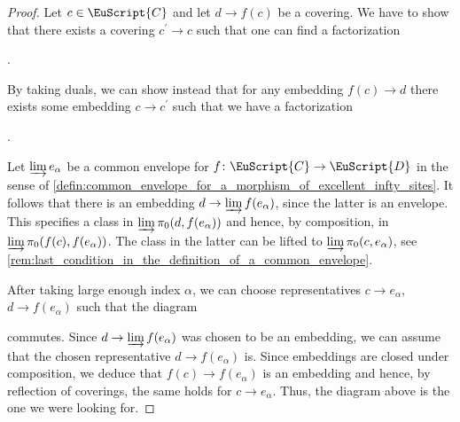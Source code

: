 \documentclass[oneside,a4paper]{amsart}
\newcommand{\euscr}[1]{\EuScript{#1}} %
\newcommand{\ccat}{\euscr{C}} %
\newcommand{\dcat}{\euscr{D}} %
\theoremstyle{plain}
\theoremstyle{definition}
\theoremstyle{remark}
\begin{document}
\begin{proof}
Let $c \in \ccat$ and let $d \rightarrow f(c)$ be a covering. We have to show that there exists a covering $c^{\prime} \rightarrow c$ such that one can find a factorization

\begin{center}
	.
\end{center}
By taking duals, we can show instead that for any embedding $f(c) \rightarrow d$ there exists some embedding $c \rightarrow c^{\prime}$ such that we have a factorization 

\begin{center}
	.
\end{center}
Let $\varinjlim e_{\alpha}$ be a common envelope for $f \colon \ccat \rightarrow \dcat$ in the sense of \cref{defin:common_envelope_for_a_morphism_of_excellent_infty_sites}. It follows that there is an embedding $d \rightarrow \varinjlim f(e_{\alpha})$, since the latter is an envelope. This specifies a class in $\varinjlim \pi_{0}(d, f(e_{\alpha}))$ and hence, by composition, in $\varinjlim \pi_{0}(f(c), f(e_{\alpha}))$. The class in the latter can be lifted to $\varinjlim \pi_{0}(c, e_{\alpha})$, see \cref{rem:last_condition_in_the_definition_of_a_common_envelope}. 

After taking large enough index $\alpha$, we can choose representatives $c \rightarrow e_{\alpha}$, $d \rightarrow f(e_{\alpha})$ such that the diagram 

\begin{center}
\end{center}
commutes. Since $d \rightarrow \varinjlim f(e_{\alpha})$ was chosen to be an embedding, we can assume that the chosen representative $d \rightarrow f(e_{\alpha})$ is. Since embeddings are closed under composition, we deduce that $f(c) \rightarrow f(e_{\alpha})$ is an embedding and hence, by reflection of coverings, the same holds for $c \rightarrow e_{\alpha}$. Thus, the diagram above is the one we were looking for. 
\end{proof}
\end{document}
